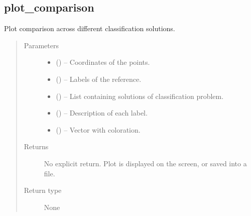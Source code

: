 \documentclass[letterpaper,10pt,english]{sphinxmanual}
\begin{document}
\subsection{plot\_comparison}
\label{\detokenize{api/ucf.plot_comparison:plot-comparison}}\label{\detokenize{api/ucf.plot_comparison::doc}}

\begin{fulllineitems}
\label{\detokenize{api/ucf.plot_comparison:ucf.plot_comparison}}
Plot comparison across different classification solutions.
\begin{quote}\begin{description}
\item[{Parameters}] \leavevmode\begin{itemize}
\item {} 
 () -- Coordinates of the points.

\item {} 
 () -- Labels of the reference.

\item {} 
 () -- List containing solutions of classification problem.

\item {} 
 () -- Description of each label.

\item {} 
 () -- Vector with coloration.

\end{itemize}

\item[{Returns}] \leavevmode
No explicit return. Plot is displayed on the screen, or saved
into a file.

\item[{Return type}] \leavevmode
None

\end{description}\end{quote}

\end{fulllineitems}
\end{document}
